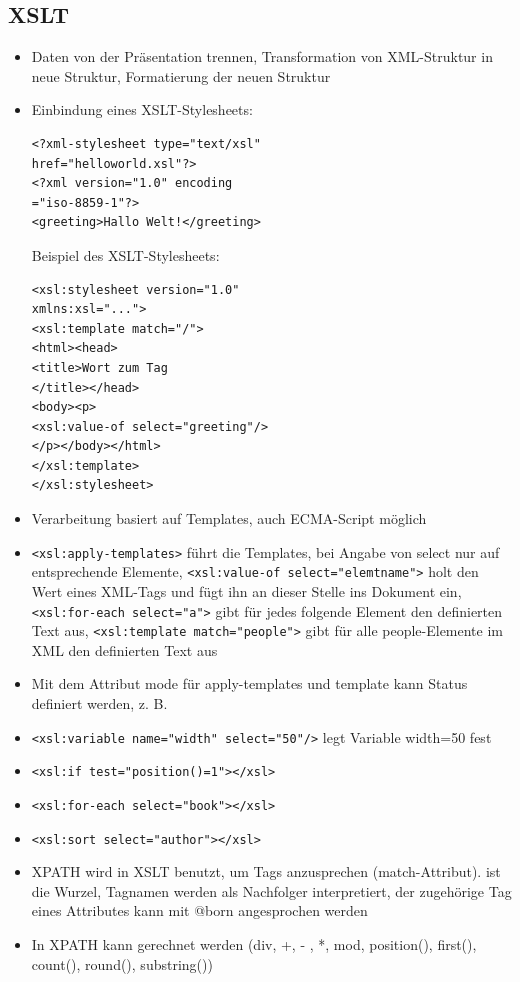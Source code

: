 \documentclass[12pt,landscape]{article}
\begin{document}
\begin{multicols}{3}
\section{XSLT}
\begin{itemize}
\item Daten von der Präsentation trennen, Transformation von XML-Struktur in neue Struktur, Formatierung der neuen Struktur
\item Einbindung eines XSLT-Stylesheets:\\
\begin{lstlisting}
<?xml-stylesheet type="text/xsl"
href="helloworld.xsl"?>
<?xml version="1.0" encoding
="iso-8859-1"?>
<greeting>Hallo Welt!</greeting>
\end{lstlisting}
Beispiel des XSLT-Stylesheets:
\begin{lstlisting}
<xsl:stylesheet version="1.0"
xmlns:xsl="...">
<xsl:template match="/">
<html><head>
<title>Wort zum Tag
</title></head>
<body><p>
<xsl:value-of select="greeting"/>
</p></body></html>
</xsl:template>
</xsl:stylesheet>
\end{lstlisting}
\item Verarbeitung basiert auf Templates, auch ECMA-Script möglich
\item \lstinline|<xsl:apply-templates>| führt die Templates, bei Angabe von select nur auf entsprechende Elemente, \lstinline|<xsl:value-of select="elemtname">| holt den Wert eines XML-Tags und fügt ihn an dieser Stelle ins Dokument ein, \lstinline|<xsl:for-each select="a">| gibt für jedes folgende Element den definierten Text aus, \lstinline|<xsl:template match="people">| gibt für alle people-Elemente im XML den definierten Text aus
\item Mit dem Attribut mode für apply-templates und template kann Status definiert werden, z. B.
\item \lstinline|<xsl:variable name="width" select="50"/>| legt Variable width=50 fest
\item \lstinline|<xsl:if test="position()=1"></xsl>|
\item \lstinline|<xsl:for-each select="book"></xsl>|
\item \lstinline|<xsl:sort select="author"></xsl>|
\item XPATH wird in XSLT benutzt, um Tags anzusprechen (match-Attribut). \/ ist die Wurzel, Tagnamen werden als Nachfolger interpretiert, der zugehörige Tag eines Attributes kann mit @born angesprochen werden
\item In XPATH kann gerechnet werden (div, +, - , *, mod, position(), first(), count(), round(), substring())
\end{itemize}

\end{multicols}
\end{document}
